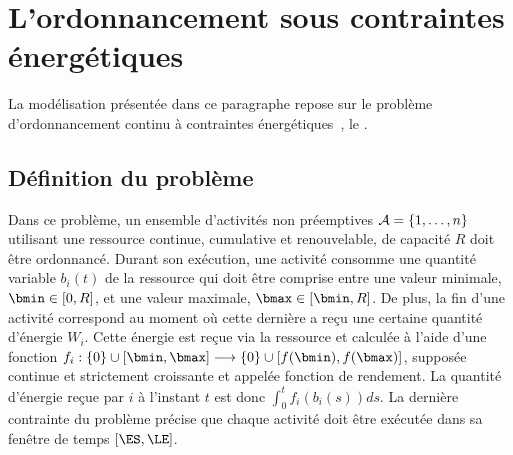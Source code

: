 
\section{L'ordonnancement sous contraintes énergétiques}
\label{sec:ordo_nrj} 
La modélisation présentée dans ce paragraphe repose sur le problème
d'ordonnancement continu à contraintes
énergétiques~\cite{ArtiguesLopez}, le \CECSP.

\subsection{Définition du problème}

Dans ce problème, un ensemble d'activités non préemptives
${\cal A}=\{1,\dots,n\}$ utilisant une ressource continue, cumulative et
renouvelable, de capacité $R$ doit être ordonnancé. Durant son
exécution, une activité consomme une quantité variable $b_i(t)$ de la
ressource qui doit être comprise entre une valeur minimale, $\bmin \in
[0,R]$, et une valeur maximale, $\bmax \in [\bmin,R]$. De plus, la fin
d'une activité correspond au moment où cette dernière a reçu une
certaine quantité d'énergie $W_i$. Cette énergie est reçue via la
ressource et calculée à l'aide d'une fonction $f_i: \{0\} \cup
[\bmin,\bmax]\longrightarrow\{0\} \cup [f(\bmin),f(\bmax)]$, supposée
continue et strictement croissante et appelée fonction de rendement. La quantité
d'énergie reçue par $i$ à l'instant $t$ est donc $\int_{0}^t
f_i(b_i(s))ds$. La dernière contrainte du problème précise que chaque activité doit
être exécutée dans sa fenêtre de temps $[\ES,\LE]$.


